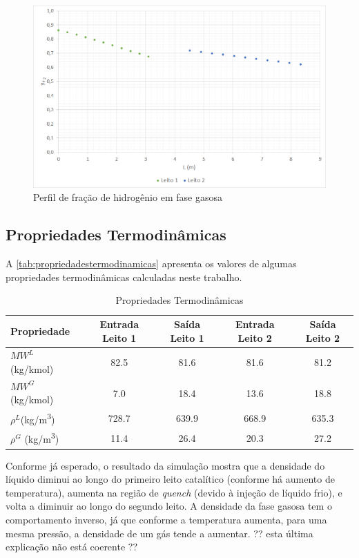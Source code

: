 \begin{figure}[htb]
\centering
\includegraphics[scale=0.4]{images/Chap4/perfilfracaoh2gas.png}
\caption{Perfil de fração de hidrogênio em fase gasosa}
\label{fig:perfilfracaoh2gas}
\end{figure}

\subsection{Propriedades Termodinâmicas} \label{propriedadestermodinâmicas}

A \autoref{tab:propriedadestermodinamicas} apresenta os valores de algumas
propriedades termodinâmicas calculadas neste trabalho.

\begin{table}[!htb]
\begin{center}
\caption{Propriedades Termodinâmicas}
\label{tab:propriedadestermodinamicas}
\small
\begin{tabular}{lcccc}
{Propriedade} & {Entrada Leito 1} & {Saída Leito 1} & {Entrada Leito 2} &
{Saída Leito 2}
\\
\hline
{$MW^{L}$ (\si{kg/kmol})} & 82.5 & 81.6 & 81.6 & 81.2 \\
{$MW^{G}$ (\si{kg/kmol})} & 7.0 & 18.4 & 13.6 & 18.8 \\
{$\rho^{L}$(\si{kg/m^3})} & 728.7 & 639.9 & 668.9 & 635.3 \\
{$\rho^{G}$ (\si{kg/m^3})} & 11.4 & 26.4 & 20.3 & 27.2 \\
\bottomrule
\end{tabular}
\end{center}
\end{table}

Conforme já esperado, o resultado da simulação mostra que a densidade do líquido
diminui ao longo do primeiro leito catalítico (conforme há aumento de
temperatura), aumenta na região de \emph{quench} (devido à injeção de líquido
frio), e volta a diminuir ao longo do segundo leito. A densidade da fase gasosa
tem o comportamento inverso, já que conforme a temperatura aumenta, para uma
mesma pressão, a densidade de um gás tende a aumentar.
?? esta última explicação não está coerente ??

